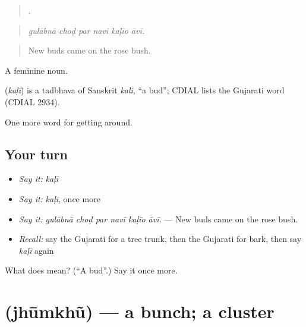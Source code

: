 \begin{quote}
     .
\end{quote}

\begin{quote}
\emph{gulābnā choḍ par navī kaḷīo āvī.}
\end{quote}

\begin{quote}
New buds came on the rose bush.
\end{quote}

A feminine noun.

\begin{cousinweb}
\textbf{} (\emph{kaḷī}) is a tadbhava of Sanskrit \emph{kali}, \textquotedblleft{}a bud\textquotedblright{}; CDIAL lists the Gujarati word (CDIAL 2934).
\end{cousinweb}

\begin{grammarlens}[title={What you've built}]
One more word for getting around.
\end{grammarlens}

\subsection*{Your turn}
\begin{itemize}
\raggedright
  \item \emph{Say it:} \emph{kaḷī}
  \item \emph{Say it:} \emph{kaḷī}, once more
  \item \emph{Say it:} \emph{gulābnā choḍ par navī kaḷīo āvī.} — New buds came on the rose bush.
  \item \emph{Recall:} say the Gujarati for a tree trunk, then the Gujarati for bark, then say \emph{kaḷī} again
\end{itemize}

\begin{tcolorbox}[breakable,colback=teal!4,colframe=teal!35!black,title={Before you move on}]
What does  mean? (\textquotedblleft{}A bud\textquotedblright{}.) Say it once more.
\end{tcolorbox}
\section[\texorpdfstring{\gu{ઝૂમખું} (jhūmkhũ)}{ઝૂમખું (jhūmkhũ)}]{ (jhūmkhũ) — a bunch; a cluster}

\label{lesson:GU-C444-jhumkhu}



